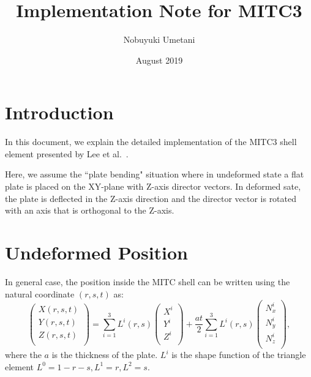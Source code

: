 \documentclass{article}
\title{Implementation Note for  MITC3}
\author{Nobuyuki Umetani}
\date{August 2019}
\begin{document}
\maketitle

\section{Introduction}

In this document, we explain the detailed implementation of the MITC3 shell element presented by Lee et al.~\cite{lee2004development}.

Here, we assume the ``plate bending" situation where in undeformed state a flat plate is placed on the XY-plane with Z-axis director vectors.
%
In deformed sate, the plate is deflected in the Z-axis direction and the director vector is rotated with an axis that is orthogonal to the Z-axis.


\section{Undeformed Position}

In general case, the position inside the MITC shell can be written using the natural coordinate $(r,s,t)$ as:
\begin{equation}
\left(\begin{array}{l} X(r,s,t)\\ Y(r,s,t)\\ Z(r,s,t)\\ \end{array}\right)
 = \sum_{i=1}^3 L^i(r,s)
\left(\begin{array}{l} X^i\\ Y^i\\ Z^i\\ \end{array}\right)
 + \frac{at}{2}\sum_{i=1}^3 L^i(r,s) 
\left(\begin{array}{l} N^i_x\\ N^i_y\\ N^i_z\\ \end{array}\right),
\end{equation}
where the $a$ is the thickness of the plate.
%
$L^i$ is the shape function of the triangle element $L^0=1-r-s, L^1=r,L^2=s$.
%
\end{document}

